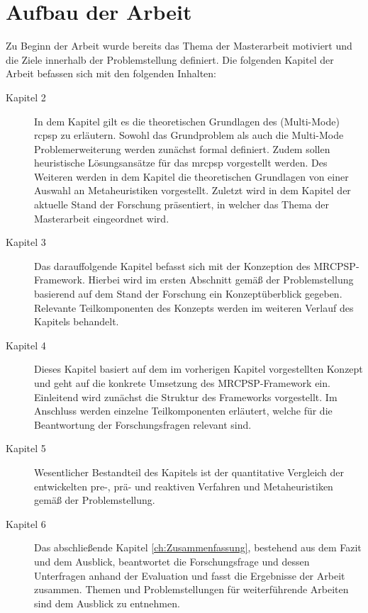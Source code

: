 \section{Aufbau der Arbeit} \label{sec:Aufbau}

Zu Beginn der Arbeit wurde bereits das Thema der Masterarbeit motiviert und die Ziele innerhalb der Problemstellung definiert. Die folgenden Kapitel der Arbeit befassen sich mit den folgenden Inhalten:
\begin{description}
    \item[Kapitel 2] In dem Kapitel gilt es die theoretischen Grundlagen des (Multi-Mode) \acl{rcpsp} zu erläutern. Sowohl das Grundproblem als auch die Multi-Mode Problemerweiterung werden zunächst formal definiert. Zudem sollen heuristische Lösungsansätze für das \acs{mrcpsp} vorgestellt werden. Des Weiteren werden in dem Kapitel die theoretischen Grundlagen von einer Auswahl an Metaheuristiken vorgestellt. Zuletzt wird in dem Kapitel der aktuelle Stand der Forschung präsentiert, in welcher das Thema der Masterarbeit eingeordnet wird. \\ 
    \item[Kapitel 3] Das darauffolgende Kapitel befasst sich mit der Konzeption des MRCPSP-Framework. Hierbei wird im ersten Abschnitt gemäß der Problemstellung basierend auf dem Stand der Forschung ein Konzeptüberblick gegeben. Relevante Teilkomponenten des Konzepts werden im weiteren Verlauf des Kapitels behandelt. \\
    \item[Kapitel 4] Dieses Kapitel basiert auf dem im vorherigen Kapitel vorgestellten Konzept und geht auf die konkrete Umsetzung des MRCPSP-Framework ein. Einleitend wird zunächst die Struktur des Frameworks vorgestellt. Im Anschluss werden einzelne Teilkomponenten erläutert, welche für die Beantwortung der Forschungsfragen relevant sind. \\
    \item[Kapitel 5] Wesentlicher Bestandteil des Kapitels ist der quantitative Vergleich der entwickelten pre-, prä- und reaktiven Verfahren und Metaheuristiken gemäß der Problemstellung. \\ 
    \item[Kapitel 6] Das abschließende Kapitel \ref{ch:Zusammenfassung}, bestehend aus dem Fazit und dem Ausblick, beantwortet die Forschungsfrage und dessen Unterfragen anhand der Evaluation und fasst die Ergebnisse der Arbeit zusammen. Themen und Problemstellungen für weiterführende Arbeiten sind dem Ausblick zu entnehmen. \\ 
\end{description}